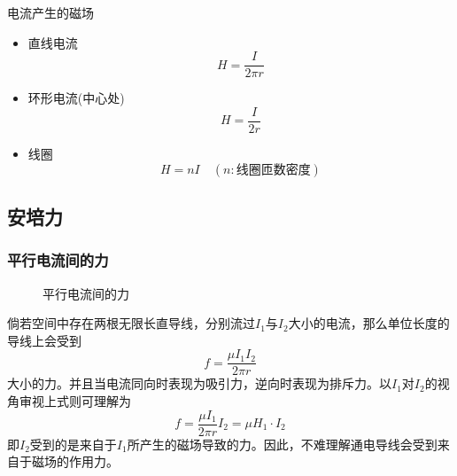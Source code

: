 \begin{itembox}[l]{电流产生的磁场}
    \begin{itemize}
        \item 直线电流
        \begin{equation*}
            H=\frac{I}{2\pi r}
        \end{equation*}
        \item 环形电流(中心处)
        \begin{equation*}
            H=\frac{I}{2r}
        \end{equation*}
        \item 线圈
        \begin{equation*}
            H=nI\quad(n:\textrm{线圈匝数密度})
        \end{equation*}
    \end{itemize}
\end{itembox}

\subsection{安培力}
\label{subsec:4.3.2}

\subsubsection{平行电流间的力}

\begin{figure}[ht!]
    \centering
    \caption{平行电流间的力}
\end{figure}
倘若空间中存在两根无限长直导线，分别流过$I_1$与$I_2$大小的电流，那么单位长度的导线上会受到
\begin{equation*}
    f=\frac{\mu I_1I_2}{2\pi r}
\end{equation*}
大小的力。并且当电流同向时表现为吸引力，逆向时表现为排斥力。以$I_1$对$I_2$的视角审视上式则可理解为
\begin{equation*}
    f=\frac{\mu I_1}{2\pi r}I_2=\mu H_1\cdot I_2
\end{equation*}
即$I_2$受到的是来自于$I_1$所产生的磁场导致的力。因此，不难理解通电导线会受到来自于磁场的作用力。

